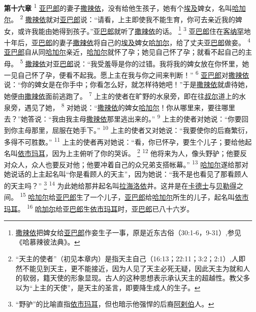 \textbf{第十六章\quad}
\textsuperscript{1}
\uline{亚巴郎}的妻子\uline{撒辣依}，没有给他生孩子，她有个\uline{埃及}婢女，名叫\uline{哈加尔}。
\textsuperscript{2}
\uline{撒辣依}就对\uline{亚巴郎}说：“请看，上主即使我不能生育，你可去亲近我的婢女，或许我能由她得到孩子。”\uline{亚巴郎}就听了\uline{撒辣依}的话。
\footnote{\uline{撒辣依}把婢女给\uline{亚巴郎}作妾生子一事，原是近东古俗（30:1-6，9-31）,参见《哈慕辣彼法典》。}
\textsuperscript{3}
\uline{亚巴郎}住在\uline{客纳罕}地十年后，\uline{亚巴郎}的妻子\uline{撒辣依}将自己的\uline{埃及}婢女\uline{哈加尔}，给了丈夫\uline{亚巴郎}做妾。
\textsuperscript{4}
\uline{亚巴郎}自从同\uline{哈加尔}亲近，\uline{哈加尔}就怀了孕；她见自己怀了孕；就看不起自己的主母。
\textsuperscript{5}
\uline{撒辣依}对\uline{亚巴郎}说：“我受羞辱是你的过错。我将我的婢女放在你怀里，她一见自己怀了孕，便看不起我。愿上主在我与你之间来判断！”
\textsuperscript{6}
\uline{亚巴郎}对\uline{撒辣依}说：“你的婢女是在你手中；你看怎么好，就怎样待她吧！”于是\uline{撒辣依}就虐待她，她便由\uline{撒辣依}面前逃跑了。
\textsuperscript{7}
上主的使者在旷野的水泉旁，即在往\uline{叔尔}道上的水泉旁，遇见了她，
\textsuperscript{8}
对她说：“\uline{撒辣依}的婢女\uline{哈加尔}！你从哪里来，要往哪里去？”她答说：“我由我主母\uline{撒辣依}那里逃出来的。”
\textsuperscript{9}
上主的使者对她说：“你要回到你主母那里，屈服在她手下。”
\textsuperscript{10}
上主的使者又对她说：“我要使你的后裔繁衍，多得不可胜数。”
\textsuperscript{11}
上主的使者再对她说：“看，你已怀孕，要生个儿子；要给他起名叫\uline{依市玛耳}，因为上主俯听了你的哭诉。
\footnote{“天主的使者”（初见本章内）是指天主自己（16:13；22:11；3:2；2:1）,人即然不能见到天主，更不能接近，因为人见了天主必死无疑，因此天主为就和人的软弱，籍天使的形象显现。古人的这种思想表示承认天主的超越性。教父多以为“上主的天使”，是天主的圣言，即要降生成人的生子。}
\textsuperscript{12}
他将来为人，像头野驴；他要反对众人，众人也要反对他；他要冲着自己的众兄弟支搭帐幕。”
\textsuperscript{13}
\uline{哈加尔}遂给那对她说话的上主起名叫“你是看顾人的天主”，因为她说：“我不是也看见了那看顾人的天主吗？”
\footnote{“野驴”的比喻直指\uline{依市玛耳}，但也暗示他强悍的后裔\uline{阿剌伯}人。}
\textsuperscript{14}
为此她给那井起名叫\uline{拉海}\uline{洛依}井。这井是在\uline{卡德士}与\uline{贝勒得}之间。
\textsuperscript{15}
\uline{哈加尔}给\uline{亚巴郎}生了一个儿子，\uline{亚巴郎}给\uline{哈加尔}所生的儿子，起名叫\uline{依市玛耳}。
\textsuperscript{16}
\uline{哈加尔}给\uline{亚巴郎}生\uline{依市玛耳}时，\uline{亚巴郎}已八十六岁。

